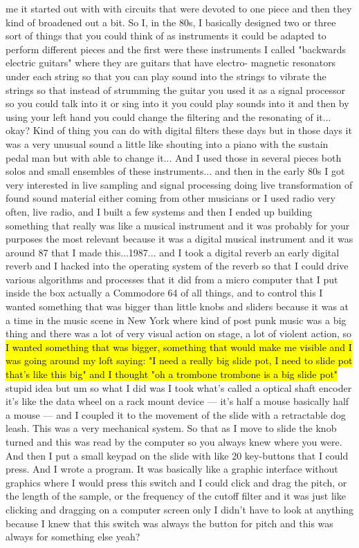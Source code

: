 me it started out with with circuits that were devoted to one piece and then they kind of broadened out a bit. So I, in the 80s, I basically designed two or three sort of things that you could think of as instruments it could be adapted to perform different pieces and the first were these instruments I called "backwards electric guitars" where they are guitars that have electro- magnetic resonators under each string so that you can play sound into the strings to vibrate the strings so that instead of strumming the guitar you used it as a signal processor so you could talk into it or sing into it you could play sounds into it and then by using your left hand you could change the filtering and the resonating of it... okay? Kind of thing you can do with digital filters these days but in those days it was a very unusual sound a little like shouting into a piano with the sustain pedal man but with able to change it... And I used those in several pieces both solos and small ensembles of these instruments... and then in the early 80s I got very interested in live sampling and signal processing doing live transformation of found sound material either coming from other musicians or I used radio very often, live radio, and I built a few systems and then I ended up building something that really was like a musical instrument and it was probably for your purposes the most relevant because it was a digital musical instrument and it was around 87 that I made this...1987... and I took a digital reverb an early digital reverb and I hacked into the operating system of the reverb so that I could drive various algorithms and processes that it did from a micro computer that I put inside the box actually a Commodore 64 of all things, and to control this I wanted something that was bigger than little knobs and sliders because it was at a time in the music scene in New York where kind of post punk music was a big thing and there was a lot of very visual action on stage, a lot of violent action, so \hl{I wanted something that was bigger, something that would make me visible and I was going around my loft saying: "I need a really big slide pot, I need to slide pot that's like this big" and I thought "oh a trombone trombone is a big slide pot"} stupid idea but um so what I did was I took what's called a optical shaft encoder it's like the data wheel on a rack mount device — it's half a mouse basically half a mouse — and I coupled it to the movement of the slide with a retractable dog leash. This was a very mechanical system. So that as I move to slide the knob turned and this was read by the computer so you always knew where you were. And then I put a small keypad on the slide with like 20 key-buttons that I could press. And I wrote a program. It was basically like a graphic interface without graphics where I would press this switch and I could click and drag the pitch, or the length of the sample, or the frequency of the cutoff filter and it was just like clicking and dragging on a computer screen only I didn't have to look at anything because I knew that this switch was always the button for pitch and this was always for something else yeah? 

